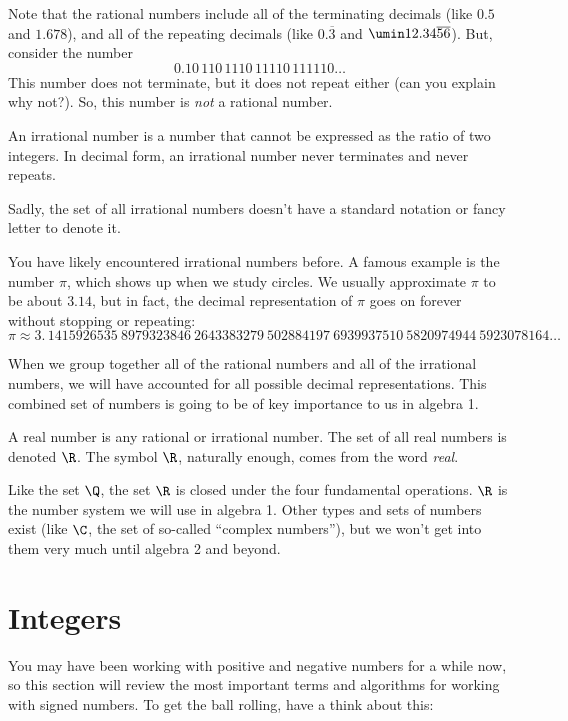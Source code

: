 Note that the rational numbers include all of the terminating decimals (like $0.5$ and $1.678$), and all of the repeating decimals (like $0.\overline{3}$ and $\umin12.34\overline{56}$). But, consider the number \[0.10\,110\,1110\,11110\,111110\ldots\] This number does not terminate, but it does not repeat either (can you explain why not?). So, this number is {\em not} a rational number.

\begin{boxeddef}
An \gls{irrational number} is a number that cannot be expressed as the ratio of two integers. In decimal form, an irrational number never terminates and never repeats.

Sadly, the set of all irrational numbers doesn't have a standard notation or fancy letter to denote it.
\end{boxeddef}

You have likely encountered irrational numbers before. A famous example is the number $\pi$, which shows up when we study circles. We usually approximate $\pi$ to be about $3.14$, but in fact, the decimal representation of $\pi$ goes on forever without stopping or repeating: \[\pi \approx 3. \, 1415926535 ~ 8979323846 ~ 2643383279 ~ 502884197 ~ 6939937510 ~ 5820974944 ~ 5923078164\ldots\]

When we group together all of the rational numbers and all of the irrational numbers, we will have accounted for all possible decimal representations. This combined set of numbers is going to be of key importance to us in algebra 1.

\begin{boxeddef}
A \gls{real number} is any rational or irrational number. The set of all real numbers is denoted $\R$. The symbol $\R$, naturally enough, comes from the word {\em real}.
\end{boxeddef}

Like the set $\Q$, the set $\R$ is closed under the four fundamental operations. $\R$ is the number system we will use in algebra 1. Other types and sets of numbers exist (like $\C$, the set of so-called ``complex numbers''), but we won't get into them very much until algebra 2 and beyond.


\section{Integers}
\label{sec:integers}

You may have been working with positive and negative numbers for a while now, so this section will review the most important terms and algorithms for working with signed numbers. To get the ball rolling, have a think about this:


